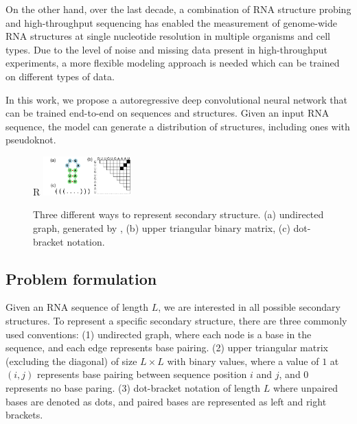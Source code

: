 \documentclass{article}
\begin{document}
On the other hand, over the last decade,
a combination of RNA structure probing and high-throughput sequencing has enabled
the measurement of genome-wide RNA structures at single nucleotide resolution in
multiple organisms and cell types\cite{mortimer2014insights, bevilacqua2016genome}.
Due to the level of noise and missing data present in high-throughput experiments,
a more flexible modeling approach is needed which can be trained on different types of data.
%

In this work, we propose a autoregressive deep convolutional neural network that can be trained end-to-end on
sequences and structures. Given an input RNA sequence,
the model can generate a distribution of structures, including ones with pseudoknot.

%
%

\begin{figure}{R}
        \centering
        \includegraphics[width=0.3\textwidth]{plot/rna_ss_binary_mat.pdf}
        \caption{Three different ways to represent secondary structure. (a) undirected graph, generated by \cite{kerpedjiev2015forna}, (b) upper triangular binary matrix, (c) dot-bracket notation.}
        \label{fig:rna_ss_binary_mat}
        \centering
\end{figure}

\subsection{Problem formulation}

Given an RNA sequence of length $L$, we are interested in all possible secondary structures.
To represent a specific secondary structure, there are three commonly used conventions:
(1) undirected graph, where each node is a base in the sequence, and each edge represents base pairing.
(2) upper triangular matrix (excluding the diagonal)
of size $L \times L$ with binary values, where a value of $1$ at $(i, j)$ represents
base pairing between sequence position $i$ and $j$, and $0$ represents no base paring.
(3) dot-bracket notation of length $L$ where unpaired bases are denoted as dots,
    and paired bases are represented as left and right brackets.
\end{document}
